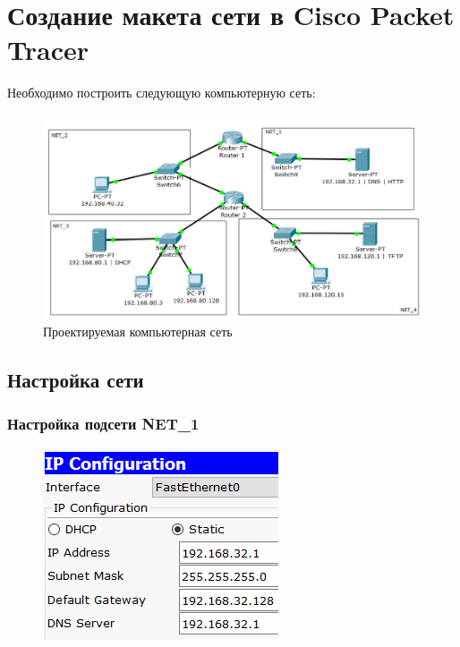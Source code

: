 \documentclass[14pt,a4paper,report]{report}
\begin{document}
\section{Создание макета сети в Cisco Packet Tracer}

Необходимо построить следующую компьютерную сеть:

\begin{figure}[h!]
	\centering
	\includegraphics[scale = 0.65]{images/0.png}
	\caption{Проектируемая компьютерная сеть}
	\label{image:0}
\end{figure}

\clearpage

\subsection{Настройка сети}

\subsubsection{Настройка подсети NET\_1}

\begin{figure}[h!]
	\centering
	\includegraphics[scale = 0.85]{images/1.png}
\end{figure}
\end{document}
